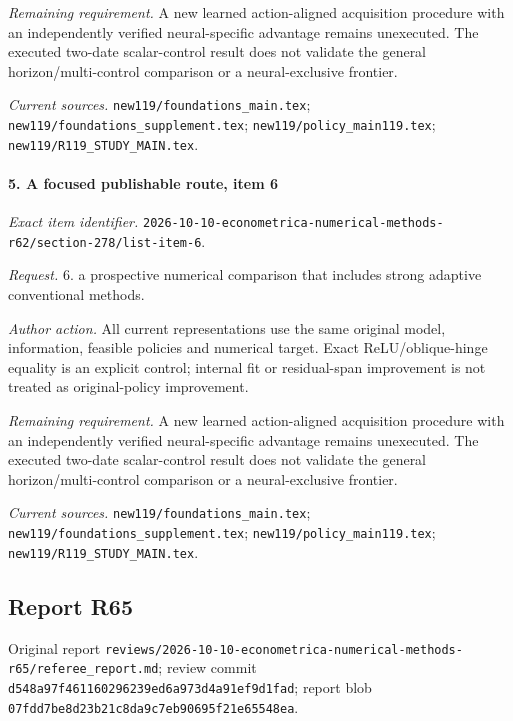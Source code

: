 \par\emph{Remaining requirement.} A new learned action-aligned acquisition procedure with an independently verified neural-specific advantage remains unexecuted. The executed two-date scalar-control result does not validate the general horizon/\allowbreak{}multi-control comparison or a neural-exclusive frontier.

\par\emph{Current sources.} \nolinkurl{new119/foundations_main.tex}; \nolinkurl{new119/foundations_supplement.tex}; \nolinkurl{new119/policy_main119.tex}; \nolinkurl{new119/R119_STUDY_MAIN.tex}.

\paragraph{5. A focused publishable route, item 6}

\emph{Exact item identifier.} \nolinkurl{2026-10-10-econometrica-numerical-methods-r62/section-278/list-item-6}.

\par\emph{Request.} 6. a prospective numerical comparison that includes strong adaptive conventional methods.

\par\emph{Author action.} All current representations use the same original model, information, feasible policies and numerical target. Exact ReLU/\allowbreak{}oblique-hinge equality is an explicit control; internal fit or residual-span improvement is not treated as original-policy improvement.

\par\emph{Remaining requirement.} A new learned action-aligned acquisition procedure with an independently verified neural-specific advantage remains unexecuted. The executed two-date scalar-control result does not validate the general horizon/\allowbreak{}multi-control comparison or a neural-exclusive frontier.

\par\emph{Current sources.} \nolinkurl{new119/foundations_main.tex}; \nolinkurl{new119/foundations_supplement.tex}; \nolinkurl{new119/policy_main119.tex}; \nolinkurl{new119/R119_STUDY_MAIN.tex}.

\subsection{Report R65}

Original report \nolinkurl{reviews/2026-10-10-econometrica-numerical-methods-r65/referee_report.md}; review commit \nolinkurl{d548a97f461160296239ed6a973d4a91ef9d1fad}; report blob \nolinkurl{07fdd7be8d23b21c8da9c7eb90695f21e65548ea}.

